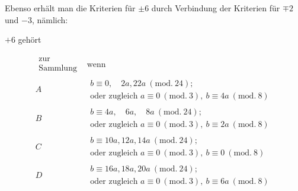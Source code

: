Ebenso erhält man die Kriterien für $\pm6$ durch Verbindung der Kriterien für $\mp2$ und $-3$, nämlich:
\begin{center}$+6$ gehört\end{center}
{\small
\[
\begin{array}{c|l}
\substack{\text{zur}\\\text{Sammlung}}&\text{wenn}\\
A&\begin{aligned}b\equiv0,\quad2a,22a\ (\mathrm{mod.}\ 24);\\\text{oder zugleich }a\equiv0\ (\mathrm{mod.}\ 3),\ b\equiv4a\ (\mathrm{mod.}\ 8)\end{aligned}\\
B&\begin{aligned}b\equiv4a,\quad6a,\quad8a\ (\mathrm{mod.}\ 24);\\\text{oder zugleich }a\equiv0\ (\mathrm{mod.}\ 3),\ b\equiv2a\ (\mathrm{mod.}\ 8)\end{aligned}\\
C&\begin{aligned}b\equiv10a,12a,14a\ (\mathrm{mod.}\ 24);\\\text{oder zugleich }a\equiv0\ (\mathrm{mod.}\ 3),\ b\equiv0\ (\mathrm{mod.}\ 8)\end{aligned}\\
D&\begin{aligned}b\equiv16a,18a,20a\ (\mathrm{mod.}\ 24);\\\text{oder zugleich }a\equiv0\ (\mathrm{mod.}\ 3),\ b\equiv6a\ (\mathrm{mod.}\ 8)\end{aligned}
\end{array}
\]
}

